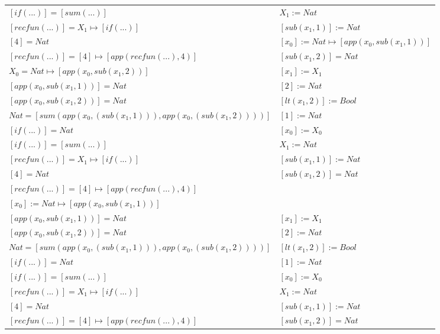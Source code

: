 \begin{exercise}
\begin{description}
\begin{center}
\begin{longtable}{ | l | l | }
                        $[if(...)] = [sum(...)]$ & $X_1 := Nat$ \\
                        $[recfun(...)] = X_1 \mapsto [if(...)]$ & $[sub(x_1,1)] := Nat$ \\
                        $[4] = Nat$ &  $[x_0] := Nat \mapsto [app(x_0, sub(x_1,1))]$  \\
                        $[recfun(...)] = [4] \mapsto [app(recfun(...), 4)]$ &  $[sub(x_1,2)] = Nat$\\
                    \hline
                        $X_0 = Nat \mapsto [app(x_0, sub(x_1,2))]$ & $[x_1] := X_1$ \\
                        $[app(x_0, sub(x_1,1))] = Nat$ & $[2] := Nat$ \\
                        $[app(x_0, sub(x_1,2))] = Nat$ & $[lt(x_1 , 2)] := Bool$ \\
                        $Nat = [sum(app(x_0, (sub(x_1,1))), app(x_0, (sub(x_1,2))))]$ & $[1] := Nat$ \\
                        $[if(...)] = Nat$ & $[x_0] := X_0$ \\
                        $[if(...)] = [sum(...)]$ & $X_1 := Nat$  \\
                        $[recfun(...)] = X_1 \mapsto [if(...)]$ & $[sub(x_1,1)] := Nat$  \\
                        $[4] = Nat$ &  $[sub(x_1,2)] = Nat$ \\
                        $[recfun(...)] = [4] \mapsto [app(recfun(...), 4)]$ & \\
                        $[x_0] := Nat \mapsto [app(x_0, sub(x_1,1))]$ & \\
                    \hline
                        $[app(x_0, sub(x_1,1))] = Nat$ & $[x_1] := X_1$ \\
                        $[app(x_0, sub(x_1,2))] = Nat$ & $[2] := Nat$ \\
                        $Nat = [sum(app(x_0, (sub(x_1,1))), app(x_0, (sub(x_1,2))))]$ & $[lt(x_1 , 2)] := Bool$ \\
                        $[if(...)] = Nat$ & $[1] := Nat$ \\
                        $[if(...)] = [sum(...)]$ & $[x_0] := X_0$ \\
                        $[recfun(...)] = X_1 \mapsto [if(...)]$ & $X_1 := Nat$ \\
                        $[4] = Nat$ &  $[sub(x_1,1)] := Nat$ \\
                        $[recfun(...)] = [4] \mapsto [app(recfun(...), 4)]$ &  $[sub(x_1,2)] = Nat$ \\

\end{longtable}
\end{center}
\end{description}
\end{exercise}
